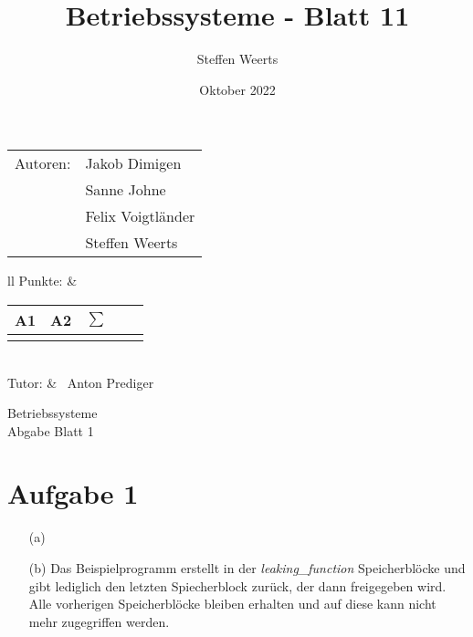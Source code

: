 \documentclass[12pt,a4paper,oneside,ngerman]{article}
\title{Betriebssysteme - Blatt 11}
\author{Steffen Weerts}
\date{Oktober 2022}
\newcommand{\fach}{Betriebssysteme}
\newcommand{\dokumentenTitel}{Abgabe Blatt 1}
\newcommand{\tutor}{Anton Prediger}
\newcommand{\memberOne}{Jakob Dimigen}
\newcommand{\memberTwo}{Sanne Johne}
\newcommand{\memberThree}{Felix Voigtl\"ander}
\newcommand{\memberFour}{Steffen Weerts}
\begin{document}
\thispagestyle{plain}

\begin{multicols}{2} %
		\hspace{-1cm} %
		\begin{tabular}{ll} %
			Autoren: & \memberOne \\ %
			& \memberTwo \\
			& \memberThree  \\
			& \memberFour \\ %
			 
		\end{tabular}
		
		\columnbreak %
		\hspace{-1cm} %
		\raggedleft \begin{tabular}{ll} %
			Punkte: &  
			\renewcommand{\arraystretch}{1.2} 
			\begin{tabular}{|p{0.8cm}|p{0.8cm}|p{0.8cm}|p{0.8cm}|p{0.8cm}|}
				\hline A1 & A2 & $\sum\limits^{ }$ \\ \hline
				& & \\ \hline    
			\end{tabular} \\ Tutor: &  \ \tutor \\
		\end{tabular}
		
	\end{multicols} %
	
	\begin{center}
		\Large{\fach} \\
		\LARGE{\dokumentenTitel} \\
    \end{center}


\section*{Aufgabe 1}
\begin{enumerate}
	\item[(a)]
	
	
	\item[(b)]
	Das Beispielprogramm erstellt in der \textit{leaking\_function} Speicherbl\"ocke und gibt lediglich den letzten Spiecherblock zur\"uck, der dann freigegeben wird.
	Alle vorherigen Speicherbl\"ocke bleiben erhalten und auf diese kann nicht mehr zugegriffen werden.
\end{enumerate}
\end{document}

